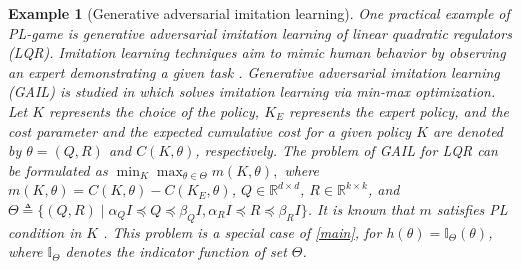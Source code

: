 \documentclass[letterpaper,11 pt]{article}
\newtheorem{example}{Example}
\newcommand{\za}[1]{{\color{black}#1}}
\begin{document}
\begin{example}[Generative adversarial imitation learning]\label{ex2}\emph{
One practical example of PL-game is generative adversarial imitation learning of linear quadratic regulators (LQR). Imitation learning techniques aim to mimic human behavior by observing
 an expert demonstrating a given task  \cite{hussein2017imitation}. Generative adversarial imitation learning (GAIL) is studied in  \cite{ho2016generative} which solves imitation learning via min-max optimization. %
Let $K$ represents the choice of the policy, $K_E$ represents the expert policy, and the cost parameter and the expected cumulative cost for a given policy $K$ are denoted by $\theta=(Q,R)$ and $C(K,\theta)$, respectively. The problem of GAIL for LQR can be formulated \cite{cai2019global} as $
\min_{K} \max_{\theta\in \Theta} m(K,\theta),$
where $m(K,\theta)=C(K,\theta)-C(K_E,\theta)$, $Q\in \mathbb R^{d\times d }$, $R\in \mathbb R^{k\times k}$, and $\Theta\triangleq \{(Q,R)\mid \alpha_Q I \preceq Q \preceq \beta_Q I, \alpha_R I \preceq R \preceq \beta_R I\}$. %
It is known that $m$ satisfies PL condition in $K$ \cite{nouiehed2019solving}. This problem is a special case of \eqref{main}, for $h(\theta)=\mathbb I_{\Theta}(\theta)$, where $\mathbb I_{\Theta}$ denotes the indicator function of set $\Theta$.}
\end{example}
\end{document}
